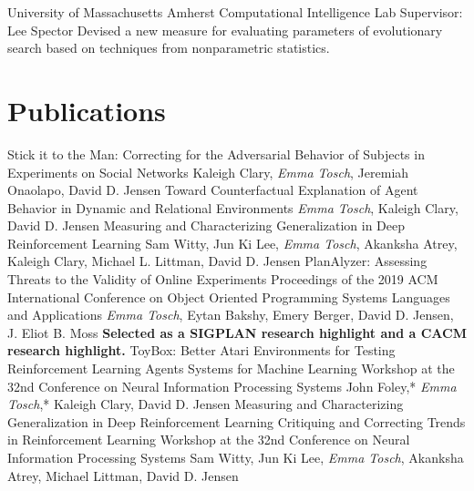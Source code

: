 \documentclass[11pt,a4paper,sans]{moderncv} %
\newcommand{\umass}{University of Massachusetts Amherst}
\newcommand{\me}{\emph{Emma Tosch}}
\begin{document}
  {\umass{}}
  {Computational Intelligence Lab}
  {Supervisor: Lee Spector}
  {Devised a new measure for evaluating parameters of evolutionary search based on techniques from nonparametric statistics.}
  

\section{Publications}
        {Stick it to the Man: Correcting for the Adversarial Behavior of Subjects in Experiments on Social Networks}
        {}
        {}
        {Kaleigh Clary, \me{}, Jeremiah Onaolapo, David D. Jensen}
        {}
        {}
        {Toward Counterfactual Explanation of Agent Behavior in Dynamic and Relational Environments}
        {}
        {}
        {\me{}, Kaleigh Clary, David D. Jensen}
        {}
        {}
        {Measuring and Characterizing Generalization in Deep Reinforcement Learning}
        {}
        {}
        {Sam Witty, Jun Ki Lee, \me{}, Akanksha Atrey, Kaleigh Clary, Michael L. Littman, David D. Jensen}
        {}
        {}          
        {PlanAlyzer: Assessing Threats to the Validity of Online Experiments}
        {}
        {Proceedings of the 2019 ACM International Conference on Object Oriented Programming Systems Languages and Applications}
  {\me{}, Eytan Bakshy, Emery Berger, David D. Jensen, J. Eliot B. Moss}
  {\textbf{Selected as a SIGPLAN research highlight and a CACM research highlight.}}
        {ToyBox: Better Atari Environments for Testing Reinforcement Learning Agents}
        {}
        {Systems for Machine Learning Workshop at the 32nd Conference on Neural Information Processing Systems}
        {John Foley,* \me{},* Kaleigh Clary, David D. Jensen}
        {}
        {}
        {Measuring and Characterizing Generalization in Deep Reinforcement Learning}
        {}
        {Critiquing and Correcting Trends in Reinforcement Learning Workshop at the 32nd Conference on Neural Information Processing Systems}
        {Sam Witty, Jun Ki Lee, \me{}, Akanksha Atrey, Michael Littman, David D. Jensen}
        {}
        {}
\end{document}
